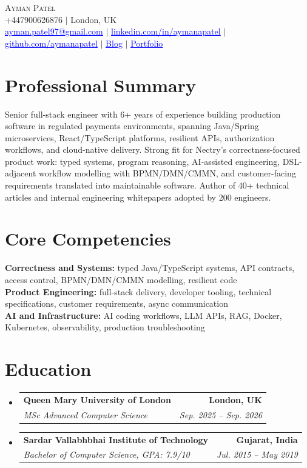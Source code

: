 \documentclass[letterpaper,11pt]{article}
\makeatletter
\newcommand{\resumeSubheading}[4]{
  \vspace{-3pt}\item
    \begin{tabular*}{1.0\textwidth}[t]{l@{\extracolsep{\fill}}r}
      \textbf{#1} & \textbf{\small #2} \\
      \textit{\small#3} & \textit{\small #4} \\
    \end{tabular*}\vspace{-7pt}
}
\newcommand{\headerLink}[2]{\href{#1}{\textcolor{blue}{\underline{#2}}}}
\newcommand{\resumeSubHeadingListStart}{\begin{itemize}[leftmargin=0.0in, label={}]}
\newcommand{\resumeSubHeadingListEnd}{\end{itemize}}
\makeatother
\begin{document}
    \begin{center}
        {\Huge\scshape Ayman Patel}
        \\ +447900626876 $|$ London, UK\\
        \small
        \headerLink{mailto:ayman.patel97@gmail.com}{ayman.patel97@gmail.com} $|$
        \headerLink{https://linkedin.com/in/aymanapatel}{linkedin.com/in/aymanapatel} $|$
        \headerLink{https://github.com/aymanapatel}{github.com/aymanapatel} $|$
        \headerLink{https://aymanace2049.hashnode.dev}{Blog} $|$
        \headerLink{https://patelofthought.com/me}{Portfolio}
    \end{center}

\section{Professional Summary}
\small{
Senior full-stack engineer with 6+ years of experience building production software in regulated payments environments, spanning Java/Spring microservices, React/TypeScript platforms, resilient APIs, authorization workflows, and cloud-native delivery. Strong fit for Nectry's correctness-focused product work: typed systems, program reasoning, AI-assisted engineering, DSL-adjacent workflow modelling with BPMN/DMN/CMMN, and customer-facing requirements translated into maintainable software. Author of 40+ technical articles and internal engineering whitepapers adopted by 200 engineers.
}
\vspace{2pt}

\section{Core Competencies}
\vspace{-7pt}
\begin{itemize}[leftmargin=0.15in, label={}]\small{\item{
\textbf{Correctness and Systems:} typed Java/TypeScript systems, API contracts, access control, BPMN/DMN/CMMN modelling, resilient code \\
\textbf{Product Engineering:} full-stack delivery, developer tooling, technical specifications, customer requirements, async communication \\
\textbf{AI and Infrastructure:} AI coding workflows, LLM APIs, RAG, Docker, Kubernetes, observability, production troubleshooting
}}
\end{itemize}

\section{Education}
  \resumeSubHeadingListStart
    \resumeSubheading
      {Queen Mary University of London}{London, UK}
      {MSc Advanced Computer Science}{Sep. 2025 -- Sep. 2026}
    \resumeSubheading
      {Sardar Vallabhbhai Institute of Technology}{Gujarat, India}
      {Bachelor of Computer Science, GPA: 7.9/10}{Jul. 2015 -- May 2019}
  \resumeSubHeadingListEnd
\end{document}
